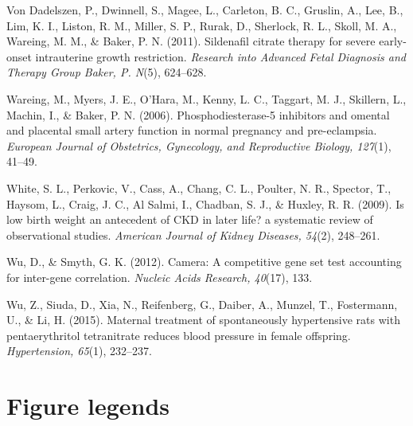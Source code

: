 \documentclass[authordate, empirical]{jote-new-article}
\begin{document}
Von Dadelszen, P., Dwinnell, S., Magee, L., Carleton, B. C., Gruslin, A., Lee, B., Lim, K. I., Liston, R. M., Miller, S. P., Rurak, D., Sherlock, R. L., Skoll, M. A., Wareing, M. M., \& Baker, P. N. (2011). Sildenafil citrate therapy for severe early-onset intrauterine growth restriction. \emph{Research into Advanced Fetal Diagnosis and Therapy Group Baker, P. N}(5), 624–628.

Wareing, M., Myers, J. E., O’Hara, M., Kenny, L. C., Taggart, M. J., Skillern, L., Machin, I., \& Baker, P. N. (2006). Phosphodiesterase-5 inhibitors and omental and placental small artery function in normal pregnancy and pre-eclampsia. \emph{European Journal of Obstetrics, Gynecology, and Reproductive Biology, 127}(1), 41–49.

White, S. L., Perkovic, V., Cass, A., Chang, C. L., Poulter, N. R., Spector, T., Haysom, L., Craig, J. C., Al Salmi, I., Chadban, S. J., \& Huxley, R. R. (2009). Is low birth weight an antecedent of CKD in later life? a systematic review of observational studies. \emph{American Journal of Kidney Diseases, 54}(2), 248–261.

Wu, D., \& Smyth, G. K. (2012). Camera: A competitive gene set test accounting for inter-gene correlation. \emph{Nucleic Acids Research, 40}(17), 133.

Wu, Z., Siuda, D., Xia, N., Reifenberg, G., Daiber, A., Munzel, T., Fostermann, U., \& Li, H. (2015). Maternal treatment of spontaneously hypertensive rats with pentaerythritol tetranitrate reduces blood pressure in female offspring. \emph{Hypertension, 65}(1), 232–237.




\clearpage
\onecolumn
\section{Figure legends}
\end{document}
